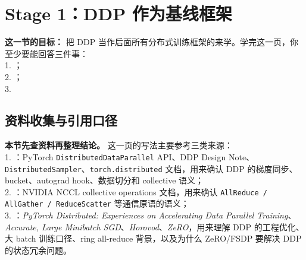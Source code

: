 
\section{Stage 1：DDP 作为基线框架}

\begin{conceptbox}
\textbf{这一节的目标：} 把 DDP 当作后面所有分布式训练框架的来学。学完这一页，你至少要能回答三件事：\\
1. ；\\
2. ；\\
3. 
\end{conceptbox}


\subsection*{资料收集与引用口径}

\begin{conceptbox}
\textbf{本节先查资料再整理结论。} 这一页的写法主要参考三类来源：\\
1. ：PyTorch \texttt{DistributedDataParallel} API、DDP Design Note、\texttt{DistributedSampler}、\texttt{torch.distributed} 文档，用来确认 DDP 的梯度同步、bucket、autograd hook、数据切分和 collective 语义；\\
2. ：NVIDIA NCCL collective operations 文档，用来确认 \texttt{AllReduce / AllGather / ReduceScatter} 等通信原语的语义；\\
3. ：\emph{PyTorch Distributed: Experiences on Accelerating Data Parallel Training}、\emph{Accurate, Large Minibatch SGD}、\emph{Horovod}、\emph{ZeRO}，用来理解 DDP 的工程优化、大 batch 训练口径、ring all-reduce 背景，以及为什么 ZeRO/FSDP 要解决 DDP 的状态冗余问题。
\end{conceptbox}

